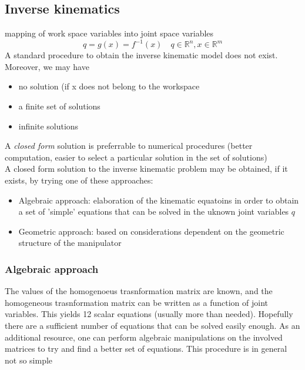 \documentclass{book}
\begin{document}
\subsection{Inverse kinematics}
mapping of work space variables into joint space variables
\[
    q=g(x)=f^{-1}(x) \quad q\in \mathbb{R}^n, x\in \mathbb{R}^m
\]
A standard procedure to obtain the inverse kinematic model does not exist.\\
Moreover, we may have 
\begin{itemize}
    \item no solution (if x does not belong to the workspace
    \item a finite set of solutions
    \item infinite solutions
\end{itemize}
A \emph{closed form} solution is preferrable to numerical procedures (better computation, easier to select a particular solution in the set of solutions)\\
A closed form solution to the inverse kinematic problem may be obtained, if it exists, by trying one of these approaches:
\begin{itemize}
    \item Algebraic approach: elaboration of the kinematic equatoins in order to obtain a set of 'simple' equations that can be solved in the uknown joint variables $q$
    \item Geometric approach: based on considerations dependent on the geometric structure of the manipulator
\end{itemize}
\subsubsection{Algebraic approach}
The values of the homogenoeus trasnformation matrix are known, and the homogeneous trasnformation matrix can be written as a function of joint variables. This yields 12 scalar equations (usually more than needed). Hopefully there are a sufficient number of equations that can be solved easily enough. As an additional resource, one can perform algebraic manipulations on the involved matrices to try and find a better set of equations. 
This procedure is in general not so simple
\end{document}
